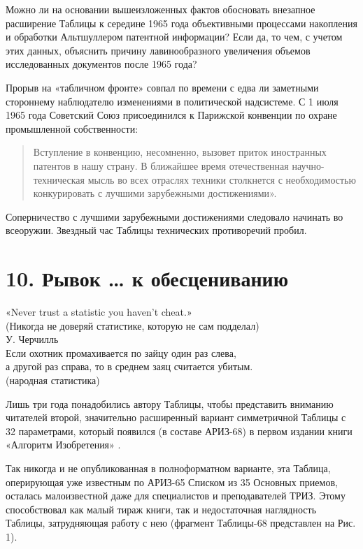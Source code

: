\documentclass[11pt,a4paper]{article}
\begin{document}
Можно ли на основании вышеизложенных фактов обосновать внезапное расширение
Таблицы к середине 1965 года объективными процессами накопления и обработки
Альтшуллером патентной информации? Если да, то чем, с учетом этих данных,
объяснить причину лавинообразного увеличения объемов исследованных документов
после 1965 года?

Прорыв на «табличном фронте» совпал по времени с едва ли заметными стороннему
наблюдателю изменениями в политической надсистеме. С 1 июля 1965 года
Советский Союз присоединился к Парижской конвенции по охране промышленной
собственности:
\begin{quote}
  Вступление в конвенцию, несомненно, вызовет приток иностранных патентов в
  нашу страну. В ближайшее время отечественная научно-техническая мысль во
  всех отраслях техники столкнется с необходимостью конкурировать с лучшими
  зарубежными достижениями». \cite{Altshuller1965}
\end{quote}

Соперничество с лучшими зарубежными достижениями следовало начинать во
всеоружии.  Звездный час Таблицы технических противоречий пробил.
\clearpage

\section*{10. Рывок … к обесцениванию}

\begin{flushright}
  «Never trust a statistic you haven't cheat.»\\
  (Никогда не доверяй статистике, которую не сам подделал)\\
  У. Черчилль\\[4pt]
  
  Если охотник промахивается по зайцу один раз слева,\\
  а другой раз справа, то в среднем заяц считается убитым.\\
  (народная статистика)
\end{flushright}

Лишь три года понадобились автору Таблицы, чтобы представить вниманию
читателей второй, значительно расширенный вариант симметричной Таблицы с 32
параметрами, который появился (в составе АРИЗ-68) в первом издании книги
«Алгоритм Изобретения» \cite{Altshuller1969}.

Так никогда и не опубликованная в полноформатном варианте, эта Таблица,
оперирующая уже известным по АРИЗ-65 Списком из 35 Основных приемов, осталась
малоизвестной даже для специалистов и преподавателей ТРИЗ. Этому способствовал
как малый тираж книги, так и недостаточная наглядность Таблицы, затрудняющая
работу с нею (фрагмент Таблицы-68 представлен на Рис. 1).
\end{document}
